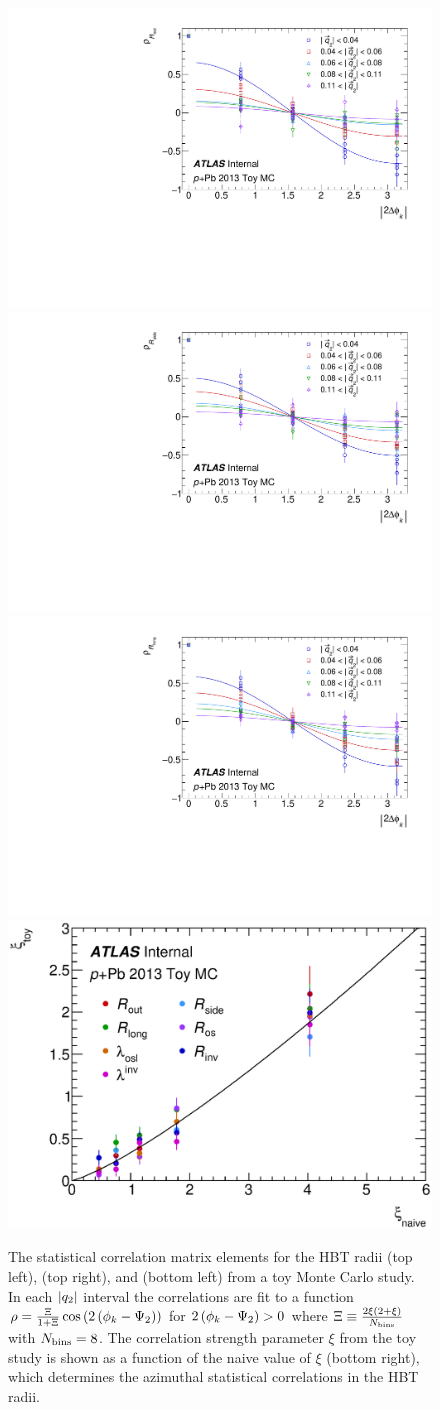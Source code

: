 \begin{figure}[h]
\centering
\includegraphics[width=.49\linewidth]{can_rho_Rout_dphi.pdf}
\includegraphics[width=.49\linewidth]{can_rho_Rside_dphi.pdf}
\includegraphics[width=.49\linewidth]{can_rho_Rlong_dphi.pdf}
\includegraphics[width=.49\linewidth]{xi_comparison.eps}
\caption{The statistical correlation matrix elements for the HBT radii \Rout (top left), \Rside (top right), and \Rlong (bottom left) from a toy Monte Carlo study. In each $|q_{2}|$ interval the correlations are fit to a function $\rho = \frac{\Xi}{1+\Xi} \cos\left(2\left(\phi_{k}-\Psi_{2}\right)\right)$ for $2\left(\phi_{k}-\Psi_{2}\right) > 0$ where $\Xi \equiv \frac{2\xi(2+\xi)}{N_\textrm{bins}}$ with $N_\textrm{bins} = 8$. The correlation strength parameter $\xi$ from the toy study is shown as a function of the naive value of $\xi$ (bottom right), which determines the azimuthal statistical correlations in the HBT radii.}
\label{fig:rho_dphi}
\end{figure}

